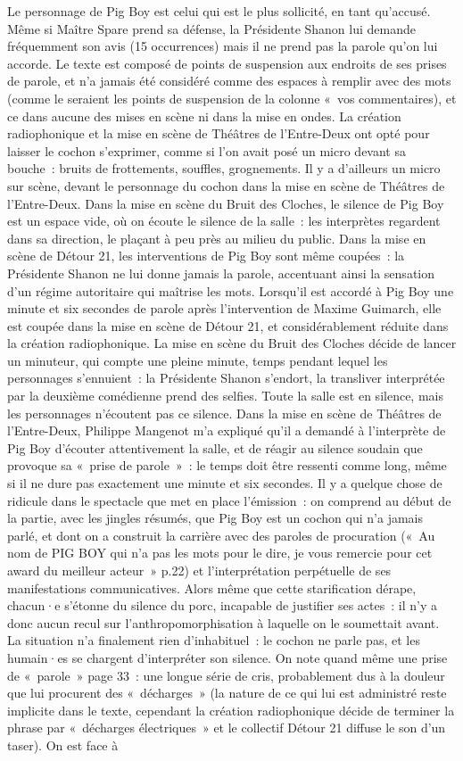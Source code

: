 \documentclass[
]{article}
\begin{document}
Le personnage de Pig Boy est celui qui est le plus sollicité, en tant qu'accusé. Même si Maître Spare prend sa défense, la Présidente Shanon lui demande fréquemment son avis (15 occurrences) mais il ne prend pas la parole qu'on lui accorde. Le texte est composé de points de suspension aux endroits de ses prises de parole, et n'a jamais été considéré comme des espaces à remplir avec des mots (comme le seraient les points de suspension de la colonne «~vos commentaires), et ce dans aucune des mises en scène ni dans la mise en ondes. La création radiophonique et la mise en scène de Théâtres de l'Entre-Deux ont opté pour laisser le cochon s'exprimer, comme si l'on avait posé un micro devant sa bouche~: bruits de frottements, souffles, grognements. Il y a d'ailleurs un micro sur scène, devant le personnage du cochon dans la mise en scène de Théâtres de l'Entre-Deux. Dans la mise en scène du Bruit des Cloches, le silence de Pig Boy est un espace vide, où on écoute le silence de la salle~: les interprètes regardent dans sa direction, le plaçant à peu près au milieu du public. Dans la mise en scène de Détour 21, les interventions de Pig Boy sont même coupées~: la Présidente Shanon ne lui donne jamais la parole, accentuant ainsi la sensation d'un régime autoritaire qui maîtrise les mots. Lorsqu'il est accordé à Pig Boy une minute et six secondes de parole après l'intervention de Maxime Guimarch, elle est coupée dans la mise en scène de Détour 21, et considérablement réduite dans la création radiophonique. La mise en scène du Bruit des Cloches décide de lancer un minuteur, qui compte une pleine minute, temps pendant lequel les personnages s'ennuient~: la Présidente Shanon s'endort, la transliver interprétée par la deuxième comédienne prend des selfies. Toute la salle est en silence, mais les personnages n'écoutent pas ce silence. Dans la mise en scène de Théâtres de l'Entre-Deux, Philippe Mangenot m'a expliqué qu'il a demandé à l'interprète de Pig Boy d'écouter attentivement la salle, et de réagir au silence soudain que provoque sa «~prise de parole~»~: le temps doit être ressenti comme long, même si il ne dure pas exactement une minute et six secondes. Il y a quelque chose de ridicule dans le spectacle que met en place l'émission~: on comprend au début de la partie, avec les jingles résumés, que Pig Boy est un cochon qui n'a jamais parlé, et dont on a construit la carrière avec des paroles de procuration («~Au nom de PIG BOY qui n'a pas les mots pour le dire, je vous remercie pour cet award du meilleur acteur~» p.22) et l'interprétation perpétuelle de ses manifestations communicatives. Alors même que cette starification dérape, chacun·e s'étonne du silence du porc, incapable de justifier ses actes~: il n'y a donc aucun recul sur l'anthropomorphisation à laquelle on le soumettait avant. La situation n'a finalement rien d'inhabituel~: le cochon ne parle pas, et les humain·es se chargent d'interpréter son silence. On note quand même une prise de «~parole~» page 33~: une longue série de cris, probablement dus à la douleur que lui procurent des «~décharges~» (la nature de ce qui lui est administré reste implicite dans le texte, cependant la création radiophonique décide de terminer la phrase par «~décharges électriques~» et le collectif Détour 21 diffuse le son d'un taser). On est face à 
\end{document}
